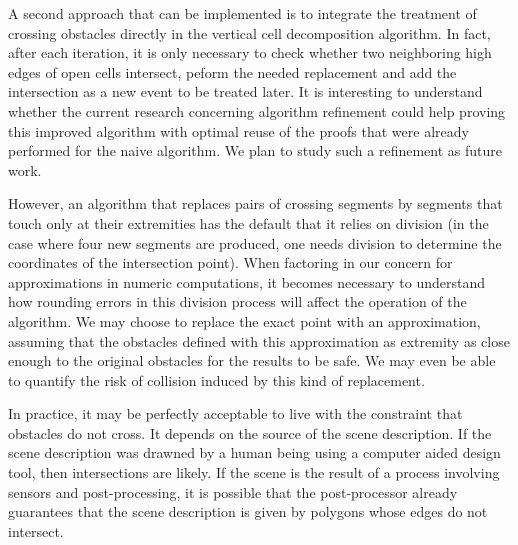 \documentclass[a4paper, USenglish, cleveref, autoref, thm-restate]{lipics-v2021}
\begin{document}
A second approach that can be implemented is to integrate the
treatment of crossing obstacles directly in the vertical cell
decomposition algorithm.  In fact, after each iteration, it is only
necessary to check whether two neighboring high edges of open cells
intersect, peform the needed replacement and add the intersection as a
new event to be treated later.  It is interesting to understand
whether the current research concerning algorithm refinement could
help proving this improved algorithm with optimal reuse of the proofs
that were already performed for the naive algorithm.  We plan to study
such a refinement as future work.

However, an algorithm that replaces pairs of crossing segments by
segments that touch only at their extremities has the default that it
relies on division (in the case where four new segments are produced,
one needs division to determine the coordinates of
the intersection point).  When factoring in our concern for
approximations in numeric computations, it becomes necessary to understand how
rounding errors in this division process will affect the operation of
the algorithm.  We may choose to replace the exact point with an
approximation, assuming that the obstacles defined with this
approximation as extremity as close enough to the original obstacles
for the results to be safe.  We may even be able to quantify the risk
of collision induced by this kind of replacement.

In practice, it may be perfectly acceptable to live with the
constraint that obstacles do not cross.  It depends on the source of
the scene description.  If the scene description was drawned by a
human being using a computer aided design tool, then intersections are
likely.  If the scene is the result of a process involving sensors and
post-processing, it is possible that the post-processor already
guarantees that the scene description is given by polygons whose edges
do not intersect.
\end{document}
